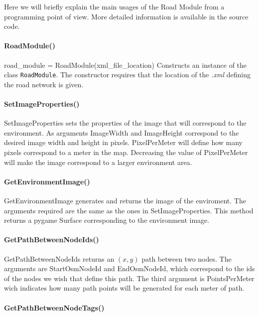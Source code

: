 Here we will briefly explain the main usages of the Road Module from a programming point of view. More detailed information is available in the source code.


\paragraph{RoadModule()}

road\_module = RoadModule(xml\_file\_location) Constructs an instance of the class \texttt{RoadModule}. The constructor requires that the location of the \textit{.xml} defining the road network is given.

\paragraph{SetImageProperties()}

SetImageProperties sets the properties of the image that will correspond to the environment. As arguments ImageWidth and ImageHeight correspond to the desired image width and height in pixels. PixelPerMeter will define how many pixels correspond to a meter in the map. Decreasing the value of PixelPerMeter will make the image correspond to a larger environment area.

\paragraph{GetEnvironmentImage()}

GetEnvironmentImage generates and returns the image of the enviroment. The arguments required are the same as the ones in SetImageProperties. This method returns a pygame Surface corresponding to the environment image.

\paragraph{GetPathBetweenNodeIds()}

GetPathBetweenNodeIds returns an $(x,y)$ path between two nodes. The arguments are StartOsmNodeId and EndOsmNodeId, which correspond to the ids of the nodes we wish that define this path. The third argument is PointsPerMeter wich indicates how many path points will be generated for each meter of path.

\paragraph{GetPathBetweenNodeTags()}

